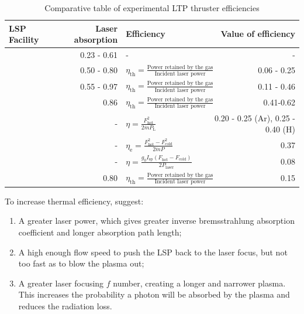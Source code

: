         \begin{table}[!ht]
            \centering
            \caption{Comparative table of experimental LTP thruster efficiencies}
            \label{tab:efficiencies}
            \begin{tabularx}{\textwidth}{@{}>{\small}X<{\raggedright} r l r@{}}
            \toprule
            {\normalsize LSP   Facility}   & Laser absorption  & Efficiency & Value of efficiency \\ \midrule
            \textcite{keeferPowerAbsorptionLasersustained1986a}   & 0.23 - 0.61      &          -        &                 -          \\
            \textcite{krierContinuousWaveLaser1986a}       & 0.50 - 0.80         & $\eta_\mathrm{th} =  \frac{\text{Power retained by the gas}}{\text{Incident laser power}}$ &  0.06 - 0.25 \\
            \textcite{zerkleLasersustainedArgonPlasmas1990}       & 0.55 - 0.97   &         $\eta_\mathrm{th} =  \frac{\text{Power retained by the gas}}{\text{Incident laser power}}$ &  0.11 - 0.46 \\
            \textcite{chenEmissionSpectroscopyCw1989a}          & 0.86                      &  $\eta_\mathrm{th} =  \frac{\text{Power retained by the gas}}{\text{Incident laser power}}$  &  0.41-0.62  \\
            \textcite{blackLaserPropulsion10kW1995}       &  -  & $ \eta = \frac{F_\mathrm{hot}^2}{2 \dot{m} P_\mathrm{L}} $& 0.20 - 0.25 (Ar), 0.25 - 0.40 (H)     \\
            \textcite{toyodaThrustPerformanceCW2002}    & -                      & $ \eta_\mathrm{e} =  \frac{F^2_\mathrm{hot} -F^2_\mathrm{cold}}{2 \dot{m} P} $     &   0.37 \\
            \textcite{takanoDemonstrationDiodeLasersustained}  &       -       & $ \eta = \frac{g_0 I_\mathrm{sp} (F_\mathrm{hot}-F_\mathrm{cold})}{2 P_\mathrm{laser}} $ & 0.08 \\ 
            \textcite{duplayArgonLaserPlasmaThruster2024a}  &  0.80&  $\eta_\mathrm{th} =  \frac{\text{Power retained by the gas}}{\text{Incident laser power}}$ & 0.15 \\
            \bottomrule
            \end{tabularx}
        \end{table}
        

        To increase thermal efficiency, \textcite{chenEmissionSpectroscopyCw1989a} suggest:
        \begin{enumerate}
            \item A greater laser power, which gives greater inverse bremsstrahlung absorption coefficient and longer absorption path length;
            \item A high enough flow speed to push the LSP back to the laser focus, but not too fast as to blow the plasma out;
            \item A greater laser focusing $f$ number, creating a longer and narrower plasma. This increases the probability a photon will be absorbed by the plasma and reduces the radiation loss.
        \end{enumerate}

